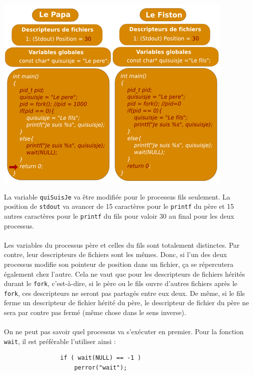 		\begin{frame}
			\begin{center}\includegraphics[scale=0.6]{img/fork2.png}\end{center}
		\end{frame}	
		
		\begin{frame}[containsverbatim]
			La variable \lstinline!quiSuisJe! va être modifiée pour le processus fils seulement. La position de \lstinline!stdout! va avancer de 15 caractères pour le \lstinline!printf! du père et 15 autres caractères pour le \lstinline!printf! du fils pour valoir 30 au final pour les deux processus.
			\\~\\
			Les variables du processus père et celles du fils sont totalement distinctes. Par contre, leur descripteurs de fichiers sont les mêmes. Donc, si l'un des deux processus modifie son pointeur de position dans un fichier, ça se répercutera également chez l'autre. Cela ne vaut que pour les descripteurs de fichiers hérités durant le \lstinline!fork!, c'est-à-dire, si le père ou le fils ouvre d'autres fichiers après le \lstinline!fork!, ces descripteurs ne seront pas partagés entre eux deux. De même, si le fils ferme un descripteur de fichier hérité du père, le descripteur de fichier du père ne sera par contre pas fermé (même chose dans le sens inverse).
			\\~\\
			\noindent On ne peut pas savoir quel processus va s'exécuter en premier. Pour la fonction \lstinline!wait!, il est préférable l'utiliser ainsi :
			\begin{lstlisting}
				if ( wait(NULL) == -1 )
					perror("wait");
			\end{lstlisting}
				
		
		\end{frame}	
		
